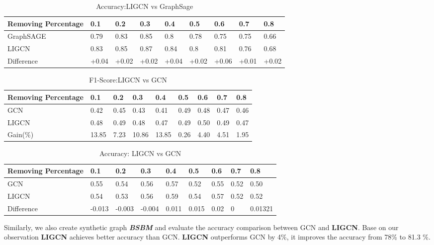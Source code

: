 \begin{table}[]
\begin{adjustbox}{width=\columnwidth,center}

\begin{tabular}{|l|l|l|l|l|l|l|l|l|}
\hline
 Removing Percentage&  0.1&0.2  &0.3  &0.4  &0.5  &0.6  &0.7  &0.8   \\ \hline
 GraphSAGE & 0.79	&0.83&	0.85&	0.8	&0.78&	0.75&	0.75&	0.66	 \\ \hline
LIGCN & 0.83&	0.85&	0.87&	0.84&	0.8&	0.81&	0.76&	0.68	 \\ \hline
Difference&	+0.04&	+0.02&	+0.02&	+0.04&	+0.02&	+0.06&	+0.01&	+0.02		\\ \hline
\end{tabular}


\end{adjustbox}
\caption{Accuracy:LIGCN vs GraphSage}
\label{tab-compare3} 
\end{table}


\begin{table}[]
\begin{adjustbox}{width=\columnwidth,center}

\begin{tabular}{|l|l|l|l|l|l|l|l|l|}
\hline
 Removing Percentage&  0.1&0.2  &0.3  &0.4  &0.5  &0.6  &0.7  &0.8   \\ \hline
GCN & 0.42&	0.45&	0.43&	0.41&	0.49&	0.48&	0.47&	0.46		 \\ \hline
LIGCN &0.48&	0.49&	0.48&	0.47&	0.49&	0.50&	0.49&	0.47		 \\ \hline
Gain(\%)&13.85&	7.23&	10.86&	13.85&	0.26&	4.40&	4.51&	1.95		\\ \hline
\end{tabular}


\end{adjustbox}
\caption{F1-Score:LIGCN vs GCN}
\label{tab-compare4} 
\end{table}


\begin{table}[]
\begin{adjustbox}{width=\columnwidth,center}

\begin{tabular}{|l|l|l|l|l|l|l|l|l|}
\hline
Removing Percentage&  0.1&0.2  &0.3  &0.4  &0.5  &0.6  &0.7  &0.8   \\ \hline
GCN & 0.55&	0.54&	0.56&	0.57&	0.52&	0.55&	0.52&	0.50		 \\ \hline
LIGCN & 0.54&	0.53&	0.56&	0.59&	0.54&	0.57&	0.52&	0.52		 \\ \hline
Difference&	-0.013&	-0.003&	-0.004&	0.011&	0.015&	0.02& 0&0.01321			\\ \hline
\end{tabular}


\end{adjustbox}
\caption{Accuracy: LIGCN vs GCN}
\label{tab-compare3} 
\end{table}




Similarly, we also create synthetic graph \textbf{{\em BSBM}} and evaluate the accuracy comparison between GCN and \textbf{LIGCN}. Base on our observation \textbf{LIGCN} achieves better accuracy than GCN. \textbf{LIGCN} outperforms GCN by 4\%, it improves the accuracy from 78\% to 81.3 \%.


